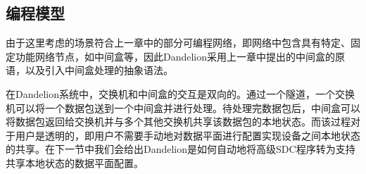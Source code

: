 
\subsection{编程模型}

由于这里考虑的场景符合上一章中的部分可编程网络，即网络中包含具有特定、固定功能网络节点，如中间盒等，因此Dandelion采用上一章中提出的中间盒的原语，以及引入中间盒处理的抽象语法。



在Dandelion系统中，交换机和中间盒的交互是双向的。通过一个隧道，一个交换机可以将一个数据包送到一个中间盒并进行处理。待处理完数据包后，中间盒可以将数据包返回给交换机并与多个其他交换机共享该数据包的本地状态。而该过程对于用户是透明的，即用户不需要手动地对数据平面进行配置实现设备之间本地状态的共享。在下一节中我们会给出Dandelion是如何自动地将高级SDC程序转为支持共享本地状态的数据平面配置。

